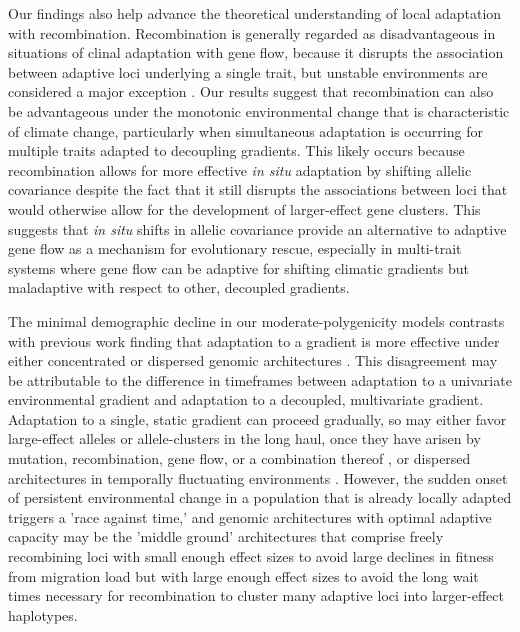 \documentclass[9pt,twocolumn,twoside,lineno]{pnas-new}
\begin{document}
Our findings also help advance the theoretical understanding
of local adaptation with recombination.
Recombination is generally regarded as disadvantageous
in situations of clinal adaptation
with gene flow, because it disrupts the
association between adaptive loci 
underlying a single trait,
but unstable environments are considered a major exception \cite{tigano}.
Our results suggest that recombination can also
be advantageous under the monotonic environmental
change that is characteristic of climate change,
particularly when simultaneous adaptation is occurring
for multiple traits adapted to decoupling gradients.
This likely occurs because recombination
allows for more effective \textit{in situ} adaptation
by shifting allelic covariance despite the fact that
it still disrupts the associations between loci
that would otherwise allow for the development of
larger-effect gene clusters.
This suggests that \textit{in situ} shifts in allelic covariance
provide an alternative to adaptive gene flow as a mechanism for evolutionary rescue,
especially in multi-trait systems where gene flow can be adaptive
for shifting climatic gradients but maladaptive with
respect to other, decoupled gradients.
 
The minimal demographic decline
in our moderate-polygenicity models
contrasts with previous work finding that adaptation
to a gradient is more effective under either
concentrated or dispersed genomic architectures \cite{yeaman_whitlock}.
This disagreement may be attributable to the
difference in timeframes between adaptation to a univariate environmental gradient
and adaptation to a decoupled, multivariate gradient.
Adaptation to a single, static gradient can proceed gradually,
so may either favor large-effect alleles or allele-clusters in the long haul,
once they have arisen by mutation, recombination, gene flow, or a combination thereof \cite{yeaman_amnat,yeaman_review},
or dispersed architectures in temporally fluctuating environments \cite{burger,kondrashov,yeaman_review,yeaman_whitlock}.
However, the sudden onset of persistent environmental change 
in a population that is already locally adapted triggers a 'race against time,' 
and genomic architectures with
optimal adaptive capacity may be the 'middle ground' architectures that comprise
freely recombining loci with small enough effect sizes to avoid large declines in fitness from migration load
but with large enough effect sizes to avoid the long wait times necessary
for recombination to cluster many adaptive loci into larger-effect haplotypes.
 
\end{document}
